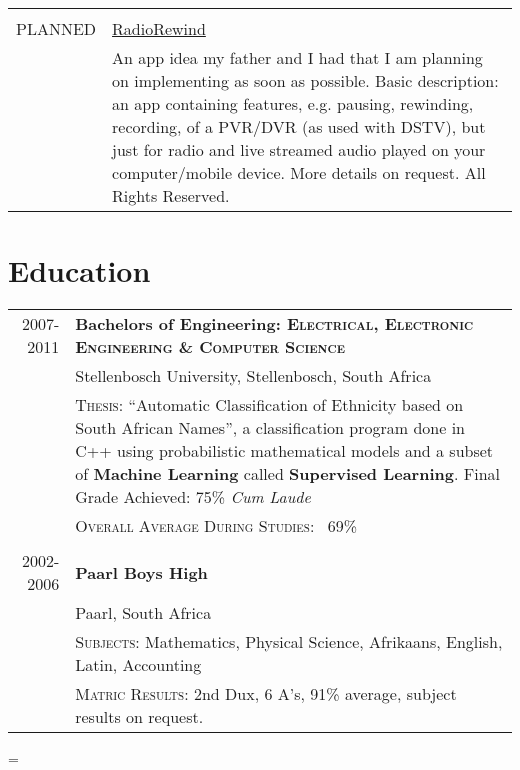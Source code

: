 \documentclass[a4paper,10pt,notitlepage]{article}
\newenvironment{absolutelynopagebreak}
  {\par\nobreak\vfil\penalty0\vfilneg
   \vtop\bgroup}
  {\par\xdef\tpd{\the\prevdepth}\egroup
   \prevdepth=\tpd}
\begin{document}
\begin{absolutelynopagebreak}
\begin{tabular}{r|p{11cm}}
\multicolumn{2}{c}{}\\
\textsc{PLANNED} &
\href{www.laurcode.com}{RadioRewind}\\&\footnotesize{An app idea my father and I had that I am planning on implementing as soon as possible. Basic description: an app containing features, e.g. pausing, rewinding, recording, of a PVR/DVR (as used with DSTV), but just for radio and live streamed audio played on your computer/mobile device. More details on request. All Rights Reserved.} \\

\end{tabular}

\section{Education}
\begin{tabular}{r|p{11cm}}

 \textsc{2007-2011} & \textbf{Bachelors of Engineering: \textsc{Electrical, Electronic Engineering \& Computer Science}} \\
& Stellenbosch University, Stellenbosch, South Africa \\
& \textsc{Thesis}: ``Automatic Classification of Ethnicity based on South African Names'', a classification program done in C++ using probabilistic mathematical models and a subset of \textbf{Machine Learning} called \textbf{Supervised Learning}. \small Final Grade Achieved: 75\% \textit{Cum Laude} \\
&\normalsize \textsc{Overall Average During Studies}: ~69\% \\

\multicolumn{2}{c}{}\\

\textsc{2002-2006} & \textbf{Paarl Boys High} \\ & \normalsize Paarl, South Africa \\
&\textsc{Subjects}: Mathematics, Physical Science, Afrikaans, English, Latin, Accounting \\
&\normalsize \textsc{Matric Results}: 2nd Dux, 6 A's, 91\% average, subject results on request. \\

\end{tabular}


\end{absolutelynopagebreak}
\end{document}
